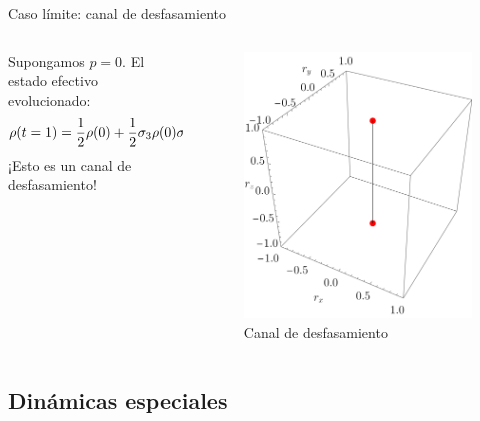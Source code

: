 \begin{frame}{Caso límite: canal de desfasamiento}
    \begin{columns}
        \begin{column}{0.5\textwidth}
            Supongamos $p=0$. El estado efectivo evolucionado:
            \begin{equation*}
              \rho(t=1)=\frac{1}{2}\rho(0)+\frac{1}{2}\sigma_{3}\rho(0)\sigma_{3}.
            \end{equation*}\pause
            ¡Esto es un canal de desfasamiento!\pause
        \end{column}
        \begin{column}{0.5\textwidth}
            \begin{figure}[h!]
                \centering
                \includegraphics[width=0.7\linewidth]{figures/maxent_results/CNOT_p=1._t=1_r=0.9.png}
                \caption{Canal de desfasamiento}
              \end{figure}
        \end{column}
    \end{columns}
\end{frame}


\subsection{Dinámicas especiales}

